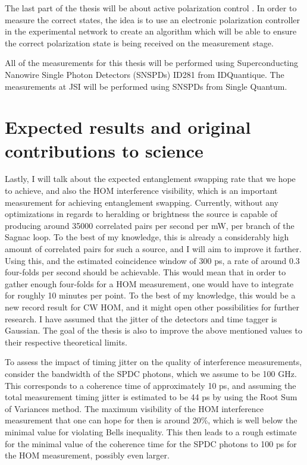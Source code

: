 \documentclass{article}
\theoremstyle{mytheoremstyle}
\theoremstyle{mytheoremstyle}
\theoremstyle{myproblemstyle}
\begin{document}
The last part of the thesis will be about active polarization control
\cite{CCSHDCDRS}. In order to measure the correct states, the
idea is to use an electronic polarization controller in the experimental network to create an algorithm which will be able to
ensure the correct polarization state is being received on the measurement stage.

All of the measurements for this thesis will be performed using Superconducting Nanowire Single Photon Detectors (SNSPDs) ID281 from IDQuantique. The
measurements at JSI will be performed using SNSPDs from Single Quantum.


\section{Expected results and original contributions to science}
Lastly, I will talk about the expected entanglement swapping rate that we hope to achieve, and also the HOM interference visibility, which
is an important measurement for achieving entanglement swapping. Currently, without any optimizations in regards to heralding
or brightness the source is capable of producing around 35000 correlated pairs per second per mW, per branch of the Sagnac loop.
To the best of my knowledge, this is already a considerably high amount of correlated pairs for such a source, and I will aim to improve it
farther. Using this, and the estimated coincidence window of 300 ps, a rate of around 0.3 four-folds per second should be achievable.
This would mean that in order to gather enough four-folds for a HOM measurement, one would have to integrate for roughly 10 minutes per point.
To the best of my knowledge, this would be a new record result for CW HOM, and it might open other possibilities for further research.
I have assumed that the jitter of the detectors and time tagger is Gaussian. The goal of the thesis is also to improve the above mentioned
values to their respective theoretical limits.
\par To assess the impact of timing jitter on the quality of interference measurements, consider the bandwidth of the SPDC photons, which we assume
to be 100 GHz. This corresponds to a coherence time of approximately 10 ps, and assuming the total measurement timing jitter is estimated
to be 44 ps by using the Root Sum of Variances method.
The maximum visibility of the HOM interference measurement that one can hope for then is around 20\%, which is well below the minimal value for violating
Bells inequality.
This then leads to a rough estimate for the minimal value of the coherence time for the SPDC photons to 100 ps for the HOM measurement, possibly even larger.
\end{document}
